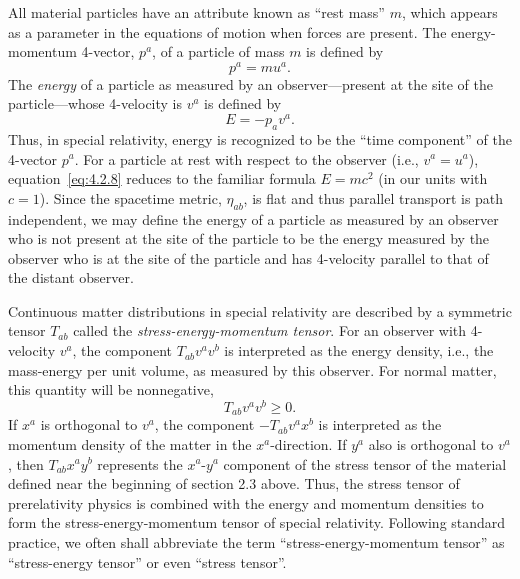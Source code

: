 All material particles have an attribute known as \textquotedblleft rest
mass\textquotedblright{} \(m\), which appears as a parameter in the equations of
motion when forces are present. The energy-momentum 4-vector, \(p^a\), of a
particle of mass \(m\) is defined by
\begin{equation}
  p^a=mu^a .
  \tag{4.2.7}\label{eq:4.2.7}
\end{equation}
The \emph{energy} of a particle as measured by an observer---present at the site
of the particle---whose 4-velocity is \(v^a\) is defined by
\begin{equation}
  E=-p_av^a .
  \tag{4.2.8}\label{eq:4.2.8}
\end{equation}
Thus, in special relativity, energy is recognized to be the
\textquotedblleft time component\textquotedblright{} of the 4-vector \(p^a\).
For a particle at rest with respect to the observer (i.e., \(v^a=u^a\)),
equation~\eqref{eq:4.2.8} reduces to the familiar formula \(E=mc^2\) (in
our units with \(c=1\)). Since the spacetime metric, \(\eta_{ab}\), is flat
and thus parallel transport is path independent, we may define the energy of a
particle as measured by an observer who is not present at the site of the particle
to be the energy measured by the observer who is at the site of the particle and
has 4-velocity parallel to that of the distant observer.

Continuous matter distributions in special relativity are described by a symmetric
tensor \(T_{ab}\) called the \emph{stress-energy-momentum tensor}. For an
observer with 4-velocity \(v^a\), the component \(T_{ab}v^av^b\) is
interpreted as the energy density, i.e., the mass-energy per unit volume, as
measured by this observer. For normal matter, this quantity will be nonnegative,
\begin{equation}
  T_{ab}v^av^b\geq 0 .
  \tag{4.2.9}\label{eq:4.2.9}
\end{equation}
If \(x^a\) is orthogonal to \(v^a\), the component \(-T_{ab}v^ax^b\) is
interpreted as the momentum density of the matter in the \(x^a\)-direction. If
\(y^a\) also is orthogonal to \(v^a\), then \(T_{ab}x^ay^b\) represents
the \(x^a\)-\(y^a\) component of the stress tensor of the material defined near
the beginning of section 2.3 above. Thus, the stress tensor of prerelativity
physics is combined with the energy and momentum densities to form the
stress-energy-momentum tensor of special relativity. Following standard practice,
we often shall abbreviate the term \textquotedblleft stress-energy-momentum
tensor\textquotedblright{} as \textquotedblleft stress-energy
tensor\textquotedblright{} or even \textquotedblleft stress
tensor\textquotedblright.


